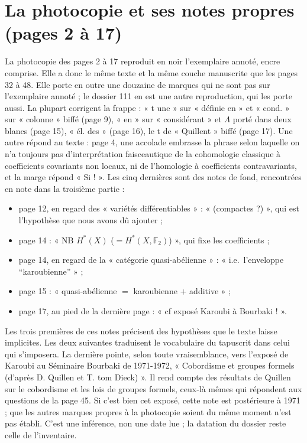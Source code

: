 \documentclass[11pt,a4paper]{article}
\begin{document}
\section*{La photocopie et ses notes propres (pages 2 à 17)}

La photocopie des pages 2 à 17 reproduit en noir l'exemplaire annoté, encre
comprise. Elle a donc le même texte et la même couche manuscrite que les pages
32 à 48. Elle porte en outre une douzaine de marques qui ne sont pas sur
l'exemplaire annoté ; le dossier 111 en est une autre reproduction, qui les
porte aussi. La plupart corrigent la frappe : « t une » sur « définie en » et
« cond. » sur « colonne » biffé (page 9), « en » sur « considérant » et
$\Lambda$ porté dans deux blancs (page 15), « él. des » (page 16), le t de
« Quillent » biffé (page 17). Une autre répond au texte : page 4, une accolade
embrasse la phrase selon laquelle on n'a toujours pas d'interprétation
faisceautique de la cohomologie classique à coefficients covariants non
locaux, ni de l'homologie à coefficients contravariants, et la marge répond
« Si ! ». Les cinq dernières sont des notes de fond, rencontrées en note dans
la troisième partie :
\begin{itemize}
  \item page 12, en regard des « variétés différentiables » : « (compactes ?)
  », qui est l'hypothèse que nous avons dû ajouter ;
  \item page 14 : « NB $H^{*}(X)$ ($= H^{*}(X, \mathbb{F}_2)$) », qui fixe
  les coefficients ;
  \item page 14, en regard de la « catégorie quasi-abélienne » : « i.e.\
  l'enveloppe “karoubienne” » ;
  \item page 15 : « quasi-abélienne $=$ karoubienne $+$ additive » ;
  \item page 17, au pied de la dernière page : « cf exposé Karoubi à Bourbaki !
  ».
\end{itemize}
Les trois premières de ces notes précisent des hypothèses que le texte laisse
implicites. Les deux suivantes traduisent le vocabulaire du tapuscrit dans celui qui
s'imposera. La dernière pointe, selon toute vraisemblance, vers l'exposé de
Karoubi au Séminaire Bourbaki de 1971-1972, « Cobordisme et groupes formels
(d'après D. Quillen et T. tom Dieck) ». Il rend compte des résultats de Quillen
sur le cobordisme et les lois de groupes formels, ceux-là mêmes qui répondent
aux questions de la page 45. Si c'est bien cet exposé, cette note est postérieure à
1971 ; que les autres marques propres à la photocopie soient du même moment
n'est pas établi. C'est une
inférence, non une date lue ; la datation du dossier reste celle de
l'inventaire.
\end{document}
